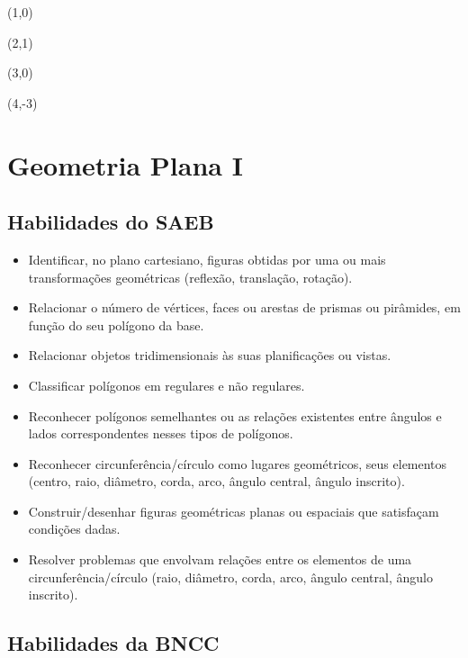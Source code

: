 \begin{escolha}

\item (1,0)

\item (2,1)

\item (3,0)

\item (4,-3)

\end{escolha}

\chapter{Geometria Plana I}

\vspace*{-1.5cm}

\section*{Habilidades do SAEB}

\begin{itemize}
  \item Identificar, no plano cartesiano, figuras obtidas por uma ou mais
transformações geométricas (reflexão, translação, rotação).
  \item Relacionar o número de vértices, faces ou arestas de prismas ou
pirâmides, em função do seu polígono da base.
  \item Relacionar objetos tridimensionais às suas planificações ou vistas.
  \item Classificar polígonos em regulares e não regulares.
  \item Reconhecer polígonos semelhantes ou as relações existentes entre
ângulos e lados correspondentes nesses tipos de polígonos.
  \item Reconhecer circunferência/círculo como lugares geométricos, seus
elementos (centro, raio, diâmetro, corda, arco, ângulo central, ângulo
inscrito).
  \item Construir/desenhar figuras geométricas planas ou espaciais que
satisfaçam condições dadas.
  \item Resolver problemas que envolvam relações entre os elementos de uma
circunferência/círculo (raio, diâmetro, corda, arco, ângulo central, ângulo
inscrito).
\end{itemize} 

\section*{Habilidades da BNCC}

